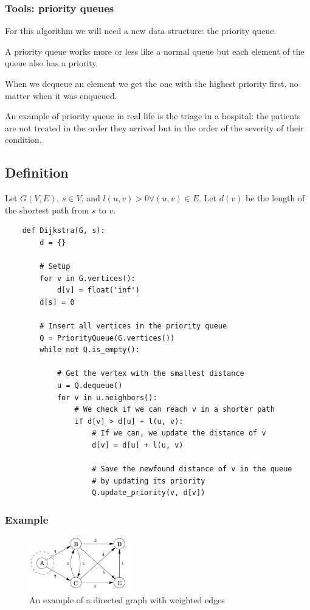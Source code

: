 \documentclass[12pt]{extarticle}
\begin{document}
\subsubsection{Tools: priority queues}

For this algorithm we will need a new data structure: the priority queue.

A priority queue works more or less like a normal queue but each element of the queue also has a priority.

When we dequeue an element we get the one with the highest priority first, no matter when it was enqueued.

An example of priority queue in real life is the triage in a hospital: the patients are not treated in the order they arrived but in the order of the severity of their condition.

\subsection{Definition}

Let $G(V, E)$, $s \in V$, and $l(u, v) > 0 \forall (u, v) \in E$. Let $d(v)$ be the length of the shortest path from $s$ to $v$.

\begin{verbatim}
    def Dijkstra(G, s):
        d = {}

        # Setup
        for v in G.vertices():
            d[v] = float('inf')
        d[s] = 0

        # Insert all vertices in the priority queue
        Q = PriorityQueue(G.vertices())
        while not Q.is_empty():

            # Get the vertex with the smallest distance
            u = Q.dequeue()
            for v in u.neighbors():
                # We check if we can reach v in a shorter path
                if d[v] > d[u] + l(u, v):
                    # If we can, we update the distance of v
                    d[v] = d[u] + l(u, v)

                    # Save the newfound distance of v in the queue
                    # by updating its priority
                    Q.update_priority(v, d[v])
\end{verbatim}

\subsubsection{Example}

\begin{figure}[H]
    \centering
    \includegraphics[width=0.4\textwidth]{assets/computer_science_2/dijsktra.png}

    \caption{An example of a directed graph with weighted edges}
    \label{fig:weighted_directedgraph}
\end{figure}
\end{document}
